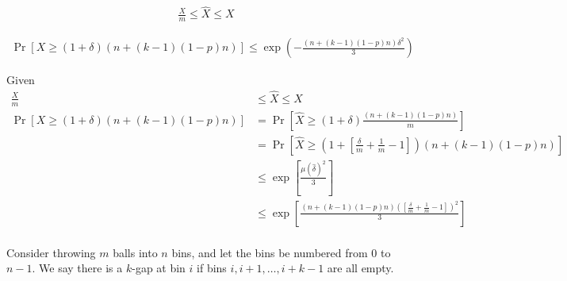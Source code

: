 \documentclass[addpoints,12pt]{exam}
\begin{document}
\begin{questions}
\begin{solution}
            \begin{align*}
                \frac{X}{m} \leq \hat{X} \leq X
            \end{align*}

            \begin{align*}
                \Pr[X \geq (1 + \delta) (n + (k - 1) (1 - p) n)] \leq \exp\left(- \frac{(n + (k - 1) (1 - p) n) \delta^2}{3}\right)
            \end{align*}

            Given
            \begin{align*}
                \frac{X}{m} &\leq \hat{X} \leq X\\
                \Pr[X \geq (1 + \delta) (n + (k - 1) (1 - p) n)] &= \Pr[\hat{X} \geq (1 + \delta) \frac{(n + (k - 1) (1 - p) n)}{m}]\\
                &= \Pr\left[\hat{X} \geq \left(1 + \left[\frac{\delta}{m} + \frac{1}{m} - 1\right]\right) (n + (k - 1) (1 - p) n)\right]\\
                &\leq \exp\left[\frac{\mu (\hat{\delta})^2}{3}\right]\\
                &\leq \exp\left[\frac{(n + (k - 1) (1 - p) n) \left(\left[\frac{\delta}{m} + \frac{1}{m} - 1\right]\right)^2}{3}\right]\\
            \end{align*}
            
		\end{solution}
		
		\question Consider throwing $m$ balls into $n$ bins, and let the bins be numbered from $0$ to $n-1$. We say there is a $k$-gap at bin $i$ if bins $i, i+1, \ldots, i+k-1$ are all empty.
\end{questions}
\end{document}
